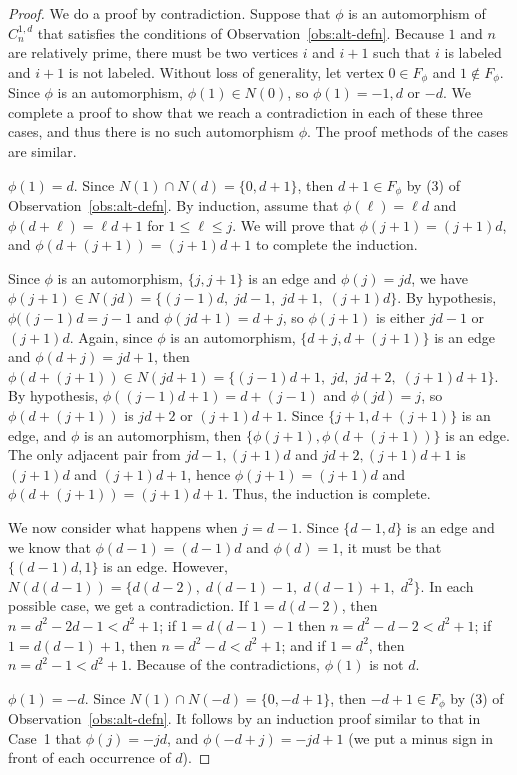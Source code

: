 \documentclass{article}
\theoremstyle{definition}
\begin{document}
\begin{proof}  We do a proof by contradiction. Suppose that $\phi$ is an automorphism of 
$C_n^{1,d}$ that satisfies the conditions of Observation~\ref{obs:alt-defn}. Because $1$ and $n$ are relatively prime, there must be two vertices $i$ and $i+1$ such that $i$ is labeled and $i+1$ is not labeled.  Without loss of generality, let vertex $0\in F_{\phi}$ and $1\not\in F_{\phi}$. 
Since $\phi$ is an automorphism, $\phi(1)\in N(0)$, so $\phi(1)=-1, d$ or $-d$. We complete a proof to show that we reach a contradiction in each of these three cases, and thus there is no such automorphism $\phi$. The proof methods of the cases are similar. 

 $\phi(1)=d$. Since $N(1)\cap N(d)=\{0,d+1\}$, then $d+1\in F_{\phi}$ by (3) of Observation~\ref{obs:alt-defn}. By induction, assume that $\phi(\ell)=\ell d$ and  $\phi(d+\ell)=\ell d+1$ for $1\leq \ell\leq j$. We will prove that
$\phi(j+1)=(j+1)d$, and $\phi(d+(j+1))=(j+1)d+1$ to complete the induction. 

Since $\phi$ is an automorphism, $\{j, j+1\}$ is an edge and $\phi(j)=jd$, we have $\phi(j+1)\in N(jd)=\{(j-1)d, \;jd-1,\; jd+1,\; (j+1)d\}$. By hypothesis, $\phi((j-1)d=j-1$ and $\phi(jd+1)=d+j$, so $\phi(j+1)$ is either $jd-1$ or $(j+1)d$. 
Again, since $\phi$ is an automorphism, $\{d+j, d+(j+1)\}$ is an edge and $\phi(d+j)=jd+1$, then $\phi(d+(j+1))\in N(jd+1)=\{(j-1)d+1,\; jd,\; jd+2, \;(j+1)d+1\}$. By hypothesis, $
\phi((j-1)d+1)=d+(j-1)$ and $\phi(jd)=j$, so $\phi(d+(j+1))$ is $jd+2$ or $(j+1)d+1$. Since $\{j+1, d+(j+1)\}$ is an edge, and $\phi$ is an automorphism, then $\{\phi(j+1),\phi(d+(j+1))\}$ is an edge. The only adjacent pair from $jd-1, (j+1)d$ and $jd+2, (j+1)d+1$ is $(j+1)d$ and $(j+1)d+1$, 
hence $\phi(j+1)=(j+1)d$ and $\phi(d+(j+1))=(j+1)d+1$. Thus, the induction is complete. 

We now consider what happens when $j=d-1$. Since $\{d-1,d\}$ is an edge and we know that $\phi(d-1)=(d-1)d$ and $\phi(d)=1$, it must be that $\{(d-1)d, 1\}$ is an edge. 
However, $N(d(d-1)) =\{d(d-2), \;d(d-1)-1, \;d(d-1)+1, \;d^2\}$. In each possible case, we get a contradiction.  
If $1=d(d-2)$, then $n=d^2-2d-1<d^2+1$; if $1=d(d-1)-1$ then $n=d^2-d-2<d^2+1$; if $1=d(d-1)+1$, then $n=d^2-d<d^2+1$; and if $1=d^2$, then $n=d^2-1<d^2+1$. 
Because of the contradictions, $\phi(1)$ is not $d$.  

 $\phi(1)=-d$. Since $N(1)\cap N(-d)=\{0,-d+1\}$, then $-d+1\in F_{\phi}$ by (3) of Observation~\ref{obs:alt-defn}. It follows by an induction proof similar to that in Case~1 that $\phi(j)=-j d$, and $\phi(-d+j)=-j d+1$ (we put a minus sign in front of each occurrence of $d$). 


\end{proof}
\end{document}
